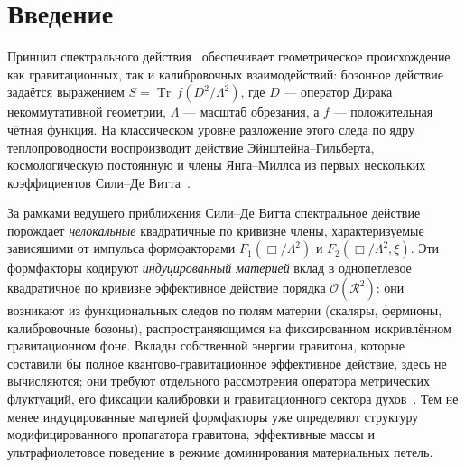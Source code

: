 \documentclass[aps,prd,twocolumn,superscriptaddress,nofootinbib,floatfix]{revtex4-2}
\theoremstyle{definition}
\theoremstyle{remark}
\newcommand{\Tr}{\operatorname{Tr}}
\begin{document}

\maketitle

\section{Введение}
\label{sec:intro}

Принцип спектрального действия~\cite{Connes:1994yd,Chamseddine:1996zu,Chamseddine:2006ep}
обеспечивает геометрическое происхождение как гравитационных, так и
калибровочных взаимодействий: бозонное действие задаётся выражением
$S = \Tr\,f(D^2/\Lambda^2)$, где $D$ --- оператор Дирака некоммутативной
геометрии, $\Lambda$ --- масштаб обрезания, а $f$ --- положительная чётная
функция. На классическом уровне разложение этого следа по ядру
теплопроводности воспроизводит действие Эйнштейна--Гильберта, космологическую
постоянную и члены Янга--Миллса из первых нескольких коэффициентов
Сили--Де Витта~\cite{Chamseddine:2010ud,vanSuijlekom:2014pya}.

За рамками ведущего приближения Сили--Де Витта спектральное действие порождает
\emph{нелокальные} квадратичные по кривизне члены, характеризуемые зависящими
от импульса формфакторами $F_1(\Box/\Lambda^2)$ и $F_2(\Box/\Lambda^2,\xi)$.
Эти формфакторы кодируют \emph{индуцированный материей} вклад в однопетлевое
квадратичное по кривизне эффективное действие порядка
$\mathcal{O}(\mathcal{R}^2)$: они возникают из функциональных следов по полям
материи (скаляры, фермионы, калибровочные бозоны), распространяющимся на
фиксированном искривлённом гравитационном фоне. Вклады собственной энергии
гравитона, которые составили бы полное квантово-гравитационное эффективное
действие, здесь не вычисляются; они требуют отдельного рассмотрения оператора
метрических флуктуаций, его фиксации калибровки и гравитационного сектора
духов~\cite{Stelle:1976gc,Buchbinder:1992rb}. Тем не менее индуцированные
материей формфакторы уже определяют структуру модифицированного пропагатора
гравитона, эффективные массы и ультрафиолетовое поведение в режиме
доминирования материальных петель.
\end{document}
